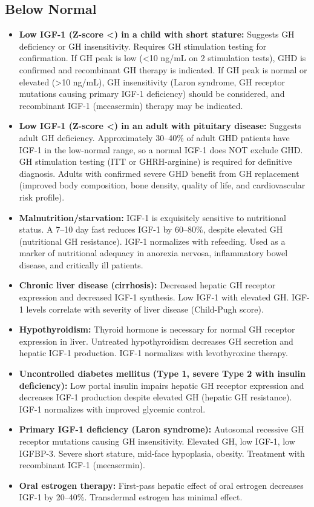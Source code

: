 \subsection*{Below Normal}
\begin{itemize}
  \item \textbf{Low IGF-1 (Z-score <) in a child with short stature:} Suggests GH deficiency or GH insensitivity. Requires GH stimulation testing for confirmation. If GH peak is low (<10 ng/mL on 2 stimulation tests), GHD is confirmed and recombinant GH therapy is indicated. If GH peak is normal or elevated (>10 ng/mL), GH insensitivity (Laron syndrome, GH receptor mutations causing primary IGF-1 deficiency) should be considered, and recombinant IGF-1 (mecasermin) therapy may be indicated.
  \item \textbf{Low IGF-1 (Z-score <) in an adult with pituitary disease:} Suggests adult GH deficiency. Approximately 30--40\% of adult GHD patients have IGF-1 in the low-normal range, so a normal IGF-1 does NOT exclude GHD. GH stimulation testing (ITT or GHRH-arginine) is required for definitive diagnosis. Adults with confirmed severe GHD benefit from GH replacement (improved body composition, bone density, quality of life, and cardiovascular risk profile).
  \item \textbf{Malnutrition/starvation:} IGF-1 is exquisitely sensitive to nutritional status. A 7--10 day fast reduces IGF-1 by 60--80\%, despite elevated GH (nutritional GH resistance). IGF-1 normalizes with refeeding. Used as a marker of nutritional adequacy in anorexia nervosa, inflammatory bowel disease, and critically ill patients.
  \item \textbf{Chronic liver disease (cirrhosis):} Decreased hepatic GH receptor expression and decreased IGF-1 synthesis. Low IGF-1 with elevated GH. IGF-1 levels correlate with severity of liver disease (Child-Pugh score).
  \item \textbf{Hypothyroidism:} Thyroid hormone is necessary for normal GH receptor expression in liver. Untreated hypothyroidism decreases GH secretion and hepatic IGF-1 production. IGF-1 normalizes with levothyroxine therapy.
  \item \textbf{Uncontrolled diabetes mellitus (Type 1, severe Type 2 with insulin deficiency):} Low portal insulin impairs hepatic GH receptor expression and decreases IGF-1 production despite elevated GH (hepatic GH resistance). IGF-1 normalizes with improved glycemic control.
  \item \textbf{Primary IGF-1 deficiency (Laron syndrome):} Autosomal recessive GH receptor mutations causing GH insensitivity. Elevated GH, low IGF-1, low IGFBP-3. Severe short stature, mid-face hypoplasia, obesity. Treatment with recombinant IGF-1 (mecasermin).
  \item \textbf{Oral estrogen therapy:} First-pass hepatic effect of oral estrogen decreases IGF-1 by 20--40\%. Transdermal estrogen has minimal effect.
\end{itemize}

